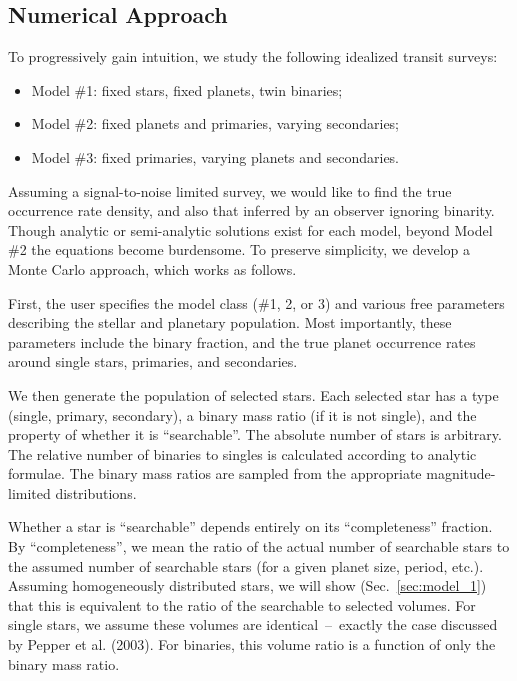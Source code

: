 \subsection{Numerical Approach}
\label{sec:numerical_methods}

To progressively gain intuition, we study the following idealized transit 
surveys:
\begin{itemize}
    \item Model \#1: fixed stars, fixed planets, twin binaries;
    \item Model \#2: fixed planets and primaries, varying secondaries;
    \item Model \#3: fixed primaries, varying planets and secondaries.
\end{itemize}

Assuming a signal-to-noise limited survey, we would like to find the true
occurrence rate density, and also that inferred by an observer ignoring 
binarity.
Though analytic or semi-analytic solutions exist for each model, beyond Model 
\#2 the equations become burdensome. To preserve simplicity, we develop a 
Monte Carlo approach, which works as follows.

First, the user specifies the model class (\#1, 2, or 3) and various free 
parameters describing the stellar and planetary population.
Most importantly, these parameters include the binary fraction, and the true 
planet occurrence rates around single stars, primaries, and secondaries.
                                                               
We then generate the population of selected stars.
Each selected star has a type (single, primary, secondary), 
a binary mass ratio (if it is not single), and the property of whether it 
is ``searchable''.               
The absolute number of stars is arbitrary.
The relative number of binaries to singles is calculated according to analytic
formulae. The binary mass ratios are sampled from the
appropriate magnitude-limited distributions.

Whether a star is ``searchable'' depends entirely on its ``completeness''
fraction. By ``completeness'', we mean the ratio of the actual number of 
searchable stars to the assumed number of searchable stars (for a given planet 
size, period, etc.).
Assuming homogeneously distributed stars, we will show 
(Sec.~\ref{sec:model_1}) that this is equivalent to the
ratio of the searchable to selected volumes.
For single stars, we assume these volumes are identical~--~exactly the case 
discussed by Pepper et al. (2003).
For binaries, this volume ratio is a function of only the binary mass ratio.

